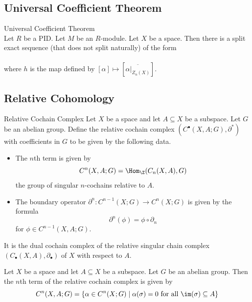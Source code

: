 \documentclass[a4paper]{article}
\begin{document}
\subsection{Universal Coefficient Theorem}
\begin{thm}{Universal Coefficient Theorem}{}\\
Let $R$ be a PID. Let $M$ be an $R$-module. Let $X$ be a space. Then there is a split exact sequence (that does not split naturally) of the form \\
\\
where $h$ is the map defined by $[\alpha]\mapsto\left[\overline{\alpha|_{Z_n(X)}}\right]$. 
\end{thm}

\subsection{Relative Cohomology}
\begin{defn}{Relative Cochain Complex}{} Let $X$ be a space and let $A\subseteq X$ be a subspace. Let $G$ be an abelian group. Define the relative cochain complex $(C^\bullet(X,A;G),\partial^\ast)$ with coefficients in $G$ to be given by the following data. 
\begin{itemize}
\item The $n$th term is given by $$C^n(X,A;G)=\Hom_\Z(C_n(X,A),G)$$ the group of singular $n$-cochains relative to $A$. 
\item The boundary operator $\partial^n:C^{n-1}(X;G)\to C^n(X;G)$ is given by the formula $$\partial^n(\phi)=\phi\circ\partial_n$$ for $\phi\in C^{n-1}(X,A;G)$. 
\end{itemize}
It is the dual cochain complex of the relative singular chain complex $(C_\bullet(X,A),\partial_\bullet)$ of $X$ with respect to $A$. 
\end{defn}

\begin{lmm}{}{} Let $X$ be a space and let $A\subseteq X$ be a subspace. Let $G$ be an abelian group. Then the $n$th term of the relative cochain complex is given by $$C^n(X,A;G)=\{\alpha\in C^n(X;G)\;|\;\alpha(\sigma)=0\text{ for all }\im(\sigma)\subseteq A\}$$
\end{lmm}
\end{document}
